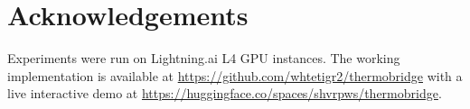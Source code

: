 \documentclass[11pt,a4paper]{article}
\begin{document}
\section*{Acknowledgements}

Experiments were run on Lightning.ai L4 GPU instances. The working implementation
is available at \url{https://github.com/whtetigr2/thermobridge} with a live
interactive demo at \url{https://huggingface.co/spaces/shvrpws/thermobridge}.




\end{document}

